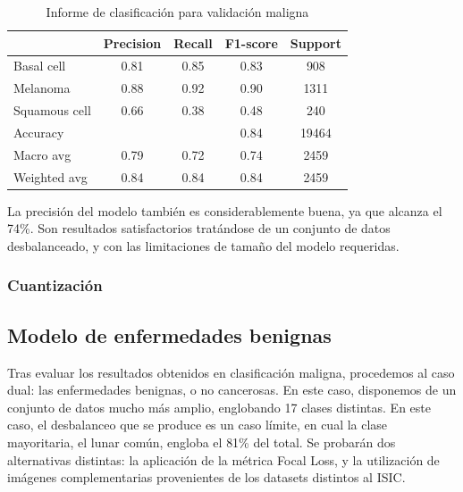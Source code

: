 \begin{table}[!ht]
	\centering
	\begin{tabular}{|l|c|c|c|c|}
		\hline
		& Precision & Recall & F1-score & Support \\
		\hline
		Basal cell & 0.81 & 0.85 & 0.83 & 908 \\
		Melanoma & 0.88 & 0.92 & 0.90 & 1311 \\
		Squamous cell & 0.66 & 0.38 & 0.48 & 240 \\
		\hline
		Accuracy &  &  & 0.84 & 19464 \\
		Macro avg & 0.79& 0.72& 0.74&2459\\
		Weighted avg&0.84&0.84&0.84&2459\\
		\hline
	\end{tabular}
	\caption{Informe de clasificación para validación maligna}
	\label{tab:malignometrics}
\end{table}

La precisión del modelo también es considerablemente buena, ya que alcanza el 74\%. Son resultados satisfactorios tratándose de un conjunto de datos desbalanceado, y con las limitaciones de tamaño del modelo requeridas.

\subsubsection{Cuantización}


\subsection{Modelo de enfermedades benignas}

Tras evaluar los resultados obtenidos en clasificación maligna, procedemos al caso dual: las enfermedades benignas, o no cancerosas. En este caso, disponemos de un conjunto de datos mucho más amplio, englobando 17 clases distintas. En este caso, el desbalanceo que se produce es un caso límite, en cual la clase mayoritaria, el lunar común, engloba el 81\% del total. Se probarán dos alternativas distintas: la aplicación de la métrica Focal Loss, y la utilización de imágenes complementarias provenientes de los datasets distintos al ISIC.

